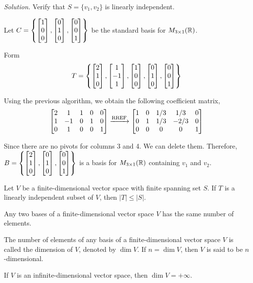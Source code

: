 \textit{Solution.} Verify that $S = \{v_1, v_2\}$ is linearly independent.

Let $C = \left\{\begin{bmatrix} 1 \\ 0 \\ 0 \end{bmatrix}, \begin{bmatrix} 0 \\ 1 \\ 0 \end{bmatrix}, \begin{bmatrix} 0 \\ 0 \\ 1 \end{bmatrix}\right\}$ be the standard basis for $M_{3 \times 1}(\mathbb{R})$.

Form
$$T = \left\{\begin{bmatrix} 2 \\ 1 \\ 0 \end{bmatrix}, \begin{bmatrix} 1 \\ -1 \\ 1 \end{bmatrix}, \begin{bmatrix} 1 \\ 0 \\ 0 \end{bmatrix}, \begin{bmatrix} 0 \\ 1 \\ 0 \end{bmatrix}, \begin{bmatrix} 0 \\ 0 \\ 1 \end{bmatrix}\right\}$$

Using the previous algorithm, we obtain the following coefficient matrix,
$$\begin{bmatrix} 2 & 1 & 1 & 0 & 0 \\ 1 & -1 & 0 & 1 & 0 \\ 0 & 1 & 0 & 0 & 1 \end{bmatrix} \xrightarrow{\text{RREF}} \begin{bmatrix} 1 & 0 & 1/3 & 1/3 & 0 \\ 0 & 1 & 1/3 & -2/3 & 0 \\ 0 & 0 & 0 & 0 & 1 \end{bmatrix}$$

Since there are no pivots for columns 3 and 4. We can delete them. Therefore, $B = \left\{\begin{bmatrix} 2 \\ 1 \\ 0 \end{bmatrix}, \begin{bmatrix} 0 \\ 1 \\ 0 \end{bmatrix}, \begin{bmatrix} 0 \\ 0 \\ 1 \end{bmatrix}\right\}$ is a basis for $M_{3 \times 1}(\mathbb{R})$ containing $v_1$ and $v_2$.

\begin{theorem}
Let $V$ be a finite-dimensional vector space with finite spanning set $S$. If $T$ is a linearly independent subset of $V$, then $|T| \leq |S|$.
\end{theorem}

\begin{corollary}
Any two bases of a finite-dimensional vector space $V$ has the same number of elements.
\end{corollary}

\begin{definition}
The number of elements of any basis of a finite-dimensional vector space $V$ is called the dimension of $V$, denoted by $\dim V$. If $n = \dim V$, then $V$ is said to be $n$-dimensional.
\end{definition}

\begin{remark}
If $V$ is an infinite-dimensional vector space, then $\dim V = +\infty$.
\end{remark}